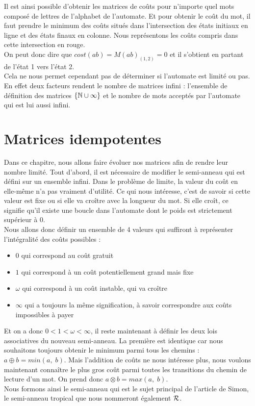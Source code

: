 \documentclass{report}
\begin{document}
Il est ainsi possible d'obtenir les matrices de coûts pour n'importe quel mots composé de lettres de l'alphabet de l'automate. Et pour obtenir le coût du mot, il faut prendre le minimum des coûts situés dans l'intersection des états initiaux en ligne et des états finaux en colonne. Nous représentons les coûts compris dans cette intersection en rouge.\\
On peut donc dire que $cost(ab) = M(ab)_{(1,2)} = 0$ et il s'obtient en partant de l'état 1 vers l'état 2.\\

Cela ne nous permet cependant pas de déterminer si l'automate est limité ou pas. En effet deux facteurs rendent le nombre de matrices infini : l'ensemble de définition des matrices $\{\mathbb{N} \cup \infty\}$ et le nombre de mots acceptés par l'automate qui est lui aussi infini.
\chapter{Matrices idempotentes}

Dans ce chapitre, nous allons faire évoluer nos matrices afin de rendre leur nombre limité. Tout d'abord, il est nécessaire de modifier le semi-anneau qui est défini sur un ensemble infini. Dans le problème de limite, la valeur du coût en elle-même n'a pas vraiment d'utilité. Ce qui nous intéresse, c'est de savoir si cette valeur est fixe ou si elle va croître avec la longueur du mot. Si elle croît, ce signifie qu'il existe une boucle dans l'automate dont le poids est strictement supérieur à 0.\\
Nous allons donc définir un ensemble de 4 valeurs qui suffiront à représenter l'intégralité des coûts possibles : 
\begin{itemize}
\item $0$ qui correspond au coût gratuit
\item $1$ qui correspond à un coût potentiellement grand mais fixe
\item $\omega$ qui correspond à un coût instable, qui va croître
\item $\infty$ qui a toujours la même signification, à savoir correspondre aux coûts impossibles à payer
\end{itemize}
$\ $\\
Et on a donc $0 < 1 < \omega < \infty$, il reste maintenant à définir les deux lois associatives du nouveau semi-anneau. La première est identique car nous souhaitons toujours obtenir le minimum parmi tous les chemins : $a \oplus b = min(a,\;b)$. Mais l'addition de coûts ne nous intéresse plus, nous voulons maintenant connaître le plus gros coût parmi toutes les transitions du chemin de lecture d'un mot. On prend donc $a \otimes b = max(a,\;b)$.\\
Nous formons ainsi le semi-anneau qui est le sujet principal de l'article de Simon, le semi-anneau tropical que nous nommeront également $\mathcal{R}$.\\
\end{document}
